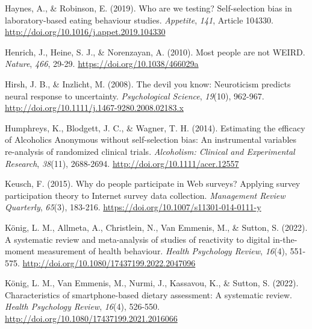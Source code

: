 \documentclass[authordate, empirical]{jote-new-article}
\begin{document}
	Haynes, A., \& Robinson, E. (2019). Who are we testing? Self-selection bias in laboratory-based eating behaviour studies. \emph{Appetite},\emph{ 141}, Article 104330. \href{http://doi.org/10.1016/j.appet.2019.104330}{http://doi.org/10.1016/j.appet.2019.104330}



	Henrich, J., Heine, S. J., \& Norenzayan, A. (2010). Most people are not WEIRD. \emph{Nature},\emph{ 466}, 29-29. \href{https://doi.org/10.1038/466029a}{https://doi.org/10.1038/466029a}



	Hirsh, J. B., \& Inzlicht, M. (2008). The devil you know: Neuroticism predicts neural response to uncertainty. \emph{Psychological Science},\emph{ 19}(10), 962-967. \href{http://doi.org/10.1111/j.1467-9280.2008.02183.x}{http://doi.org/10.1111/j.1467-9280.2008.02183.x}



	Humphreys, K., Blodgett, J. C., \& Wagner, T. H. (2014). Estimating the efficacy of Alcoholics Anonymous without self-selection bias: An instrumental variables re-analysis of randomized clinical trials. \emph{Alcoholism: Clinical and Experimental Research},\emph{ 38}(11), 2688-2694. \href{http://doi.org/10.1111/acer.12557}{http://doi.org/10.1111/acer.12557}



	Keusch, F. (2015). Why do people participate in Web surveys? Applying survey participation theory to Internet survey data collection. \emph{Management Review Quarterly},\emph{ 65}(3), 183-216. \href{https://doi.org/10.1007/s11301-014-0111-y}{https://doi.org/10.1007/s11301-014-0111-y}



	König, L. M., Allmeta, A., Christlein, N., Van Emmenis, M., \& Sutton, S. (2022). A systematic review and meta-analysis of studies of reactivity to digital in-the-moment measurement of health behaviour. \emph{Health Psychology Review},\emph{ 16}(4), 551-575. \href{http://doi.org/10.1080/17437199.2022.2047096}{http://doi.org/10.1080/17437199.2022.2047096}



	König, L. M., Van Emmenis, M., Nurmi, J., Kassavou, K., \& Sutton, S. (2022). Characteristics of smartphone-based dietary assessment: A systematic review. \emph{Health Psychology Review},\emph{ 16}(4), 526-550. \href{http://doi.org/10.1080/17437199.2021.2016066}{http://doi.org/10.1080/17437199.2021.2016066}
\end{document}
